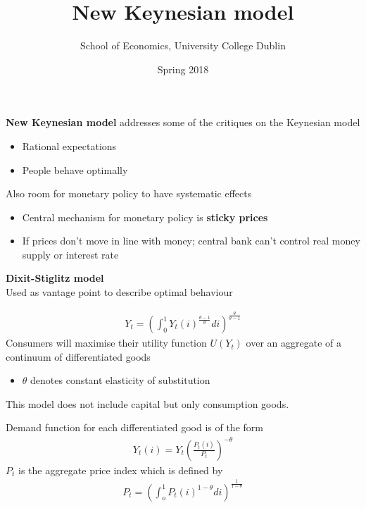 \documentclass{beamer}
\title{New Keynesian model}
\author{School of Economics, University College Dublin}
\date{Spring 2018}
\begin{document}
\begin{frame}
 \titlepage
\end{frame}

\begin{frame}
  \textbf{New Keynesian model} addresses some of the critiques on the Keynesian model
  \begin{itemize}
    \item Rational expectations
    \item People behave optimally
  \end{itemize}
  \medskip
  Also room for monetary policy to have systematic effects
  \begin{itemize}
    \item Central mechanism for monetary policy is \textbf{sticky prices}
    \item If prices don't move in line with money; central bank can't control real money supply or interest rate
  \end{itemize}
\end{frame}

\begin{frame}
 \textbf{Dixit-Stiglitz model}\\
 Used as vantage point to describe optimal behaviour  

\begin{align}
  Y_t=\left( \int_0^1 Y_t(i)^{\frac{\theta-1}{\theta}}di\right)^{\frac{\theta}{\theta-1}}
\end{align}
Consumers will maximise their utility function $U(Y_t)$ over an aggregate of a continuum of differentiated goods
\begin{itemize}
  \item $\theta$ denotes constant elasticity of substitution
\end{itemize}
\medskip
This model does not include capital but only consumption goods. 
\end{frame}


\begin{frame}
 Demand function for each differentiated good is of the form
\begin{align}
  Y_t(i)=Y_t \left( \frac{P_t(i)}{P_t}\right)^{-\theta}
\end{align}
\medskip
$P_t$ is the aggregate price index which is defined by
\begin{align}
  P_t=\left( \int_o^1 P_t(i)^{1-\theta}di \right)^{\frac{1}{1-\theta}}
\end{align}  
\end{frame}
\end{document}
